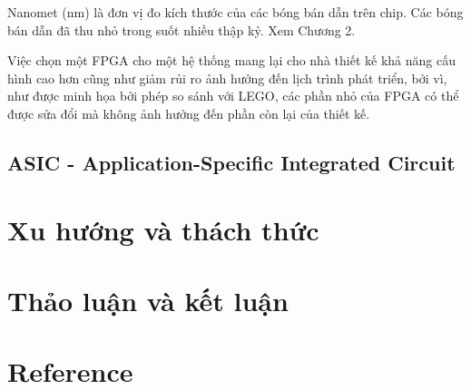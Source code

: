 \documentclass[a4paper]{article}
\begin{document}
Nanomet (nm) là đơn vị đo kích thước của các bóng bán dẫn trên chip. Các bóng bán dẫn đã thu nhỏ trong suốt nhiều thập kỷ. Xem Chương 2.

Việc chọn một FPGA cho một hệ thống mang lại cho nhà thiết kế khả năng cấu hình cao hơn cũng như giảm rủi ro ảnh hưởng đến lịch trình phát triển, bởi vì, như được minh họa bởi phép so sánh với LEGO, các phần nhỏ của FPGA có thể được sửa đổi mà không ảnh hưởng đến phần còn lại của thiết kế.
\subsection{ASIC - Application-Specific Integrated Circuit}
\section{Xu hướng và thách thức}
\section{Thảo luận và kết luận}
\section{Reference}
\end{document}
